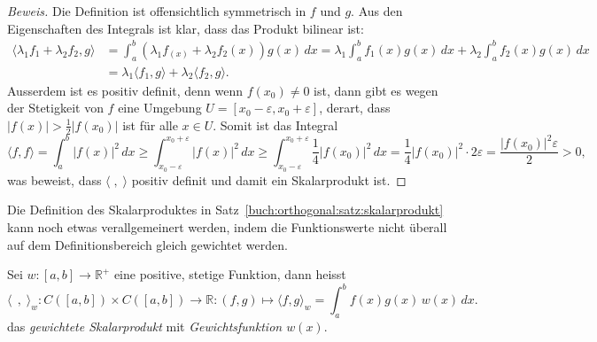 \begin{proof}[Beweis]
Die Definition ist offensichtlich symmetrisch in $f$ und $g$.
Aus den Eigenschaften des Integrals ist klar, dass das Produkt
bilinear ist:
\begin{align*}
\langle \lambda_1 f_1+\lambda_2f_2,g\rangle
&=
\int_a^b (\lambda_1f_(x) +\lambda_2f_2(x))g(x)\,dx
=
\lambda_1\int_a^b f_1(x) g(x)\,dx
+
\lambda_2\int_a^b f_2(x) g(x)\,dx
\\
&=
\lambda_1\langle f_1,g\rangle
+
\lambda_2\langle f_2,g\rangle.
\end{align*}
Ausserdem ist es positiv definit, denn wenn $f(x_0) \ne 0$ ist,
dann gibt es wegen der Stetigkeit von $f$ eine Umgebung
$U=[x_0-\varepsilon,x_0+\varepsilon]$, derart, dass $|f(x)| > \frac12|f(x_0)|$
ist für alle $x\in U$.
Somit ist das Integral
\[
\langle f,f\rangle
=
\int_a^b |f(x)|^2\,dx
\ge
\int_{x_0-\varepsilon}^{x_0+\varepsilon} |f(x)|^2\,dx
\ge
\int_{x_0-\varepsilon}^{x_0+\varepsilon} \frac14|f(x_0)|^2\,dx
=
\frac{1}{4}|f(x_0)|^2\cdot 2\varepsilon
=
\frac{|f(x_0)|^2\varepsilon}{2}
>0,
\]
was beweist, dass $\langle\;,\;\rangle$ positiv definit und damit
ein Skalarprodukt ist.
\end{proof}

Die Definition des Skalarproduktes in
Satz~\ref{buch:orthogonal:satz:skalarprodukt}
kann noch etwas verallgemeinert werden, indem 
die Funktionswerte nicht überall auf dem Definitionsbereich 
gleich gewichtet werden. 

\begin{definition}
\label{buch:orthogonal:def:skalarproduktw}
Sei $w\colon [a,b]\to \mathbb{R}^+$ eine positive, stetige Funktion,
dann heisst
\[
\langle\;\,,\;\rangle_w
\colon
C([a,b]) \times C([a,b]) \to \mathbb{R}
:
(f,g) \mapsto \langle f,g\rangle_w = \int_a^b f(x)g(x)\,w(x)\,dx.
\]
das {\em gewichtete Skalarprodukt} mit {\em Gewichtsfunktion $w(x)$}.
%
\end{definition}

%
%
